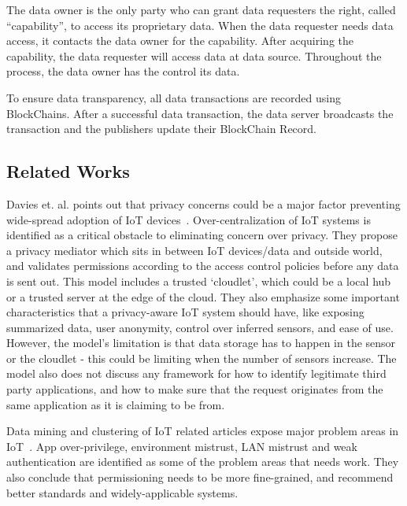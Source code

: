 The data owner is the only party who can grant data requesters the right, called “capability”, to access its proprietary data. When the data requester needs data access, it contacts the data owner for the capability. After acquiring the capability, the data requester will access data at data source. Throughout the process, the data owner has the control its data.

To ensure data transparency, all data transactions are recorded using BlockChains. After a successful data transaction, the data server broadcasts the transaction and the publishers update their BlockChain Record. 

\subsection{Related Works}
Davies et. al. points out that privacy concerns could be a major factor preventing wide-spread adoption of IoT devices~\cite{davies}. Over-centralization of IoT systems is identified as a critical obstacle to eliminating concern over privacy. They propose a privacy mediator which sits in between IoT devices/data and outside world, and validates permissions according to the access control policies before any data is sent out. This model includes a trusted `cloudlet', which could be a local hub or a trusted server at the edge of the cloud. They also emphasize some important characteristics that a privacy-aware IoT system should have, like exposing summarized data, user anonymity, control over inferred sensors, and ease of use. However, the model's limitation is that data storage has to happen in the sensor or the cloudlet - this could be limiting when the number of sensors increase. The model also does not discuss any framework for how to identify legitimate third party applications, and how to make sure that the request originates from the same application as it is claiming to be from.

Data mining and clustering of IoT related articles expose major problem areas in IoT~\cite{zhang}. App over-privilege, environment mistrust, LAN mistrust and weak authentication are identified as some of the problem areas that needs work. They also conclude that permissioning needs to be more fine-grained, and recommend better standards and widely-applicable systems.
